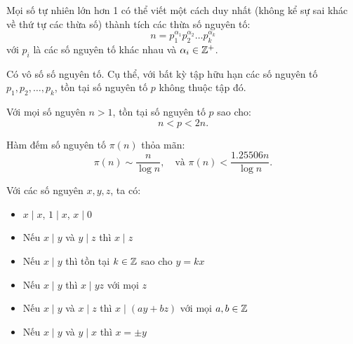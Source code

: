 \documentclass[../imo-training-open-book.tex]{subfiles}
\begin{document}
\begin{theorem}
    \label{theorem:fundamental-theorem-of-arithmetic}
    Mọi số tự nhiên lớn hơn 1 có thể viết một cách duy nhất (không kể sự sai khác về thứ tự các thừa số) thành tích các thừa số nguyên tố:
    \[
        n = p_1^{\alpha_1} p_2^{\alpha_2} \dots p_k^{\alpha_k}
    \]
    với \( p_i \) là các số nguyên tố khác nhau và \( \alpha_i \in \mathbb Z^+ \).
\end{theorem}

\vspace{1em}

\begin{theorem}
    \label{theorem:infinitely-many-primes}
    Có vô số số nguyên tố. Cụ thể, với bất kỳ tập hữu hạn các số nguyên tố \( p_1, p_2, \dots, p_k \), tồn tại số nguyên tố \( p \) không thuộc tập đó.
\end{theorem}

\vspace{1em}

\begin{theorem}
    \label{theorem:bertrand-postulate}
    Với mọi số nguyên \( n > 1 \), tồn tại số nguyên tố \( p \) sao cho:
    \[
        n < p < 2n.
    \]
\end{theorem}

\vspace{1em}

\begin{theorem}
    \label{theorem:prime-number-theorem}
    Hàm đếm số nguyên tố \( \pi(n) \) thỏa mãn:
    \[
        \pi(n) \sim \frac{n}{\log n},\quad \text{và } \pi(n) < \frac{1.25506n}{\log n}.
    \]
\end{theorem}

\vspace{1em}

\begin{theorem}
    \label{theorem:basic-divisibility-properties}
    Với các số nguyên \( x, y, z \), ta có:
    \begin{itemize}[topsep=0pt, itemsep=0pt]
        \item \( x \mid x \), \( 1 \mid x \), \( x \mid 0 \)
        \item Nếu \( x \mid y \) và \( y \mid z \) thì \( x \mid z \)
        \item Nếu \( x \mid y \) thì tồn tại \( k \in \mathbb Z \) sao cho \( y = kx \)
        \item Nếu \( x \mid y \) thì \( x \mid yz \) với mọi \( z \)
        \item Nếu \( x \mid y \) và \( x \mid z \) thì \( x \mid (ay + bz) \) với mọi \( a, b \in \mathbb Z \)
        \item Nếu \( x \mid y \) và \( y \mid x \) thì \( x = \pm y \)
    \end{itemize}
\end{theorem}
\end{document}
